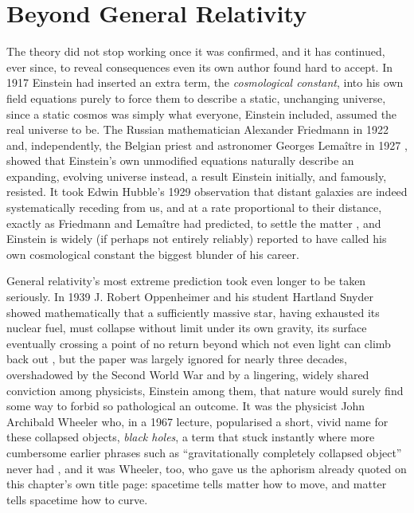 \section{Beyond General Relativity}

    The theory did not stop working once it was confirmed, and it has continued, ever since, to reveal consequences even its own author found hard to accept. In 1917 Einstein had inserted an extra term, the \textit{cosmological constant}, into his own field equations purely to force them to describe a static, unchanging universe, since a static cosmos was simply what everyone, Einstein included, assumed the real universe to be. The Russian mathematician Alexander Friedmann in 1922 \citep{friedmann1922} and, independently, the Belgian priest and astronomer Georges Lema\^{i}tre in 1927 \citep{lemaitre1927}, showed that Einstein's own unmodified equations naturally describe an expanding, evolving universe instead, a result Einstein initially, and famously, resisted. It took Edwin Hubble's 1929 observation that distant galaxies are indeed systematically receding from us, and at a rate proportional to their distance, exactly as Friedmann and Lema\^{i}tre had predicted, to settle the matter \citep{hubble1929}, and Einstein is widely (if perhaps not entirely reliably) reported to have called his own cosmological constant the biggest blunder of his career.

    General relativity's most extreme prediction took even longer to be taken seriously. In 1939 J. Robert Oppenheimer and his student Hartland Snyder showed mathematically that a sufficiently massive star, having exhausted its nuclear fuel, must collapse without limit under its own gravity, its surface eventually crossing a point of no return beyond which not even light can climb back out \citep{oppenheimersnyder1939}, but the paper was largely ignored for nearly three decades, overshadowed by the Second World War and by a lingering, widely shared conviction among physicists, Einstein among them, that nature would surely find some way to forbid so pathological an outcome. It was the physicist John Archibald Wheeler who, in a 1967 lecture, popularised a short, vivid name for these collapsed objects, \textit{black holes}, a term that stuck instantly where more cumbersome earlier phrases such as ``gravitationally completely collapsed object'' never had \citep{wheeler1998}, and it was Wheeler, too, who gave us the aphorism already quoted on this chapter's own title page: spacetime tells matter how to move, and matter tells spacetime how to curve.

